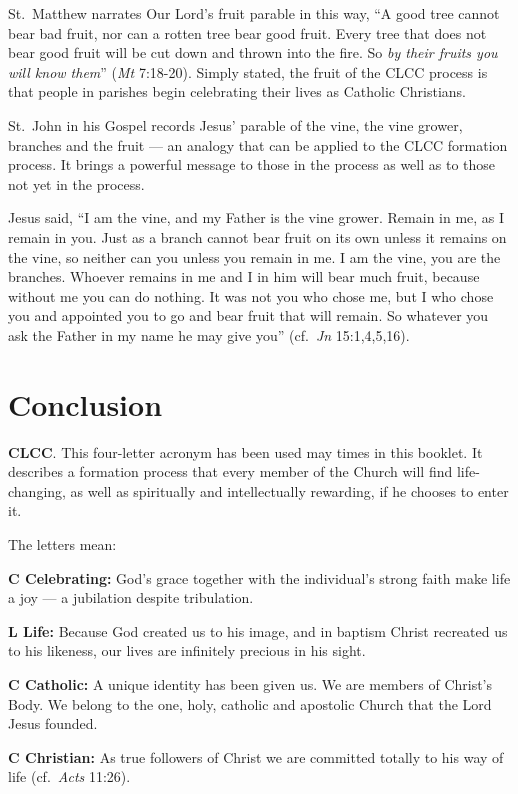\documentclass{article}
\begin{document}
St.\ Matthew narrates Our Lord's fruit parable in this way, ``A good tree cannot
bear bad fruit, nor can a rotten tree bear good fruit. Every tree that does not
bear good fruit will be cut down and thrown into the fire. So \emph{by their
fruits you will know them}'' (\emph{Mt} 7:18-20). Simply stated, the fruit of
the CLCC process is that people in parishes begin celebrating their lives as
Catholic Christians.

St.\ John in his Gospel records Jesus' parable of the vine, the vine grower,
branches and the fruit --- an analogy that can be applied to the CLCC formation
process. It brings a powerful message to those in the process as well as to
those not yet in the process.

Jesus said, ``I am the vine, and my Father is the vine grower. Remain in me, as
I remain in you. Just as a branch cannot bear fruit on its own unless it remains
on the vine, so neither can you unless you remain in me. I am the vine, you are
the branches. Whoever remains in me and I in him will bear much fruit, because
without me you can do nothing. It was not you who chose me, but I who chose you
and appointed you to go and bear fruit that will remain. So whatever you ask the
Father in my name he may give you'' (cf.\ \emph{Jn} 15:1,4,5,16).


\section{Conclusion}

\textbf{CLCC}. This four-letter acronym has been used may times in this
booklet. It describes a formation process that every member of the Church will
find life-changing, as well as spiritually and intellectually rewarding, if he
chooses to enter it. \newline

The letters mean: \newline

\textbf{C Celebrating:} God's grace together with the individual's strong faith
make life a joy --- a jubilation despite tribulation. \newline

\textbf{L Life:} Because God created us to his image, and in baptism Christ
recreated us to his likeness, our lives are infinitely precious in his
sight. \newline

\textbf{C Catholic:} A unique identity has been given us. We are members of
Christ's Body. We belong to the one, holy, catholic and apostolic Church that
the Lord Jesus founded. \newline

\textbf{C Christian:} As true followers of Christ we are committed totally to
his way of life (cf.\ \emph{Acts} 11:26).

\end{document}

